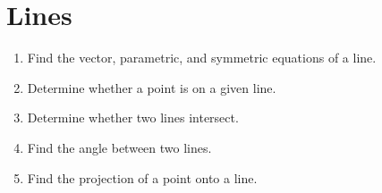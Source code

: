 \section{Lines}

\begin{outcome}
  \begin{enumerate}
  \item Find the vector, parametric, and symmetric equations of a line.
  \item Determine whether a point is on a given line.
  \item Determine whether two lines intersect.
  \item Find the angle between two lines.
  \item Find the projection of a point onto a line.
  \end{enumerate}
\end{outcome}

